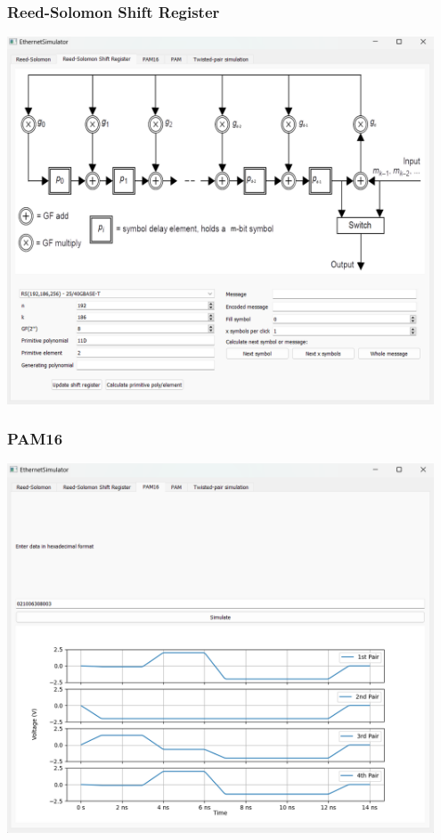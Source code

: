 \documentclass{beamer}
\begin{document}
\begin{frame}
\frametitle{Reed-Solomon Shift Register}
\includegraphics[width=0.95\textwidth]{images/prezentacja_rs_sr.png}
\end{frame}

\begin{frame}
\frametitle{PAM16}
\includegraphics[width=0.95\textwidth]{images/prezentacja_pam16.png}
\end{frame}
\end{document}
